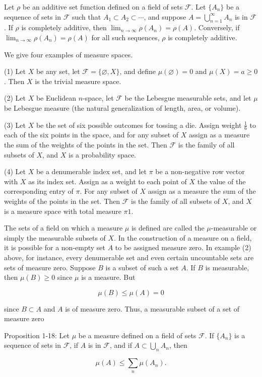 Let $\rho$ be an additive set function defined on a field of sets $\mathcal{F}$. Let $\{A_n\}$ be a sequence of sets in $\mathcal{F}$ such that $A_1 \subset A_2 \subset \cdots$, and suppose $A = \bigcup_{n=1}^{\infty} A_n$ is in $\mathcal{F}$. If $\rho$ is completely additive, then $\lim_{n \to \infty} \rho(A_n) = \rho(A)$. Conversely, if $\lim_{n \to \infty} \rho(A_n) = \rho(A)$ for all such sequences, $\rho$ is completely additive.

We give four examples of measure spaces.

(1) Let $X$ be any set, let $\mathcal{F} = \{\varnothing, X\}$, and define $\mu(\varnothing) = 0$ and $\mu(X) = a \geq 0$. Then $X$ is the trivial measure space.

(2) Let $X$ be Euclidean $n$-space, let $\mathcal{F}$ be the Lebesgue measurable sets, and let $\mu$ be Lebesgue measure (the natural generalization of length, area, or volume).

(3) Let $X$ be the set of six possible outcomes for tossing a die. Assign weight $\frac{1}{6}$ to each of the six points in the space, and for any subset of $X$ assign as a measure the sum of the weights of the points in the set. Then $\mathcal{F}$ is the family of all subsets of $X$, and $X$ is a probability space.

(4) Let $X$ be a denumerable index set, and let $\pi$ be a non-negative row vector with $X$ as its index set. Assign as a weight to each point of $X$ the value of the corresponding entry of $\pi$. For any subset of $X$ assign as a measure the sum of the weights of the points in the set. Then $\mathcal{F}$ is the family of all subsets of $X$, and $X$ is a measure space with total measure $\pi 1$.

The sets of a field on which a measure $\mu$ is defined are called the $\mu$-measurable or simply the measurable subsets of $X$. In the construction of a measure on a field, it is possible for a non-empty set $A$ to be assigned measure zero. In example (2) above, for instance, every denumerable set and even certain uncountable sets are sets of measure zero. Suppose $B$ is a subset of such a set $A$. If $B$ is measurable, then $\mu(B) \geq 0$ since $\mu$ is a measure. But

$$\mu(B) \leq \mu(A) = 0$$

since $B \subset A$ and $A$ is of measure zero. Thus, a measurable subset of a set of measure zero

Proposition 1-18: Let $\mu$ be a measure defined on a field of sets $\mathcal{F}$. If $\{A_n\}$ is a sequence of sets in $\mathcal{F}$, if $A$ is in $\mathcal{F}$, and if $A \subset \bigcup_n A_n$, then

$$\mu(A) \leq \sum_n \mu(A_n).$$
